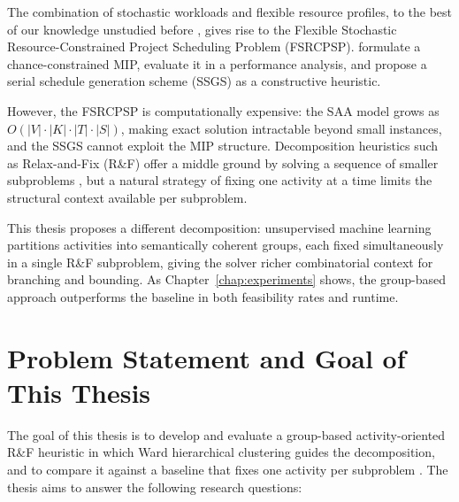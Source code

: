 The combination of stochastic workloads and flexible resource
profiles, to the best of our knowledge unstudied before
\textcite{MendlRieck2024}, gives rise to the Flexible Stochastic
Resource-Constrained Project Scheduling Problem (FSRCPSP).
\textcite{MendlRieck2024} formulate a chance-constrained MIP,
evaluate it in a performance analysis, and propose a serial
schedule generation scheme (SSGS) as a constructive heuristic.

However, the FSRCPSP is computationally expensive: the SAA model
grows as $O(|V| \cdot |K| \cdot |T| \cdot |S|)$, making exact
solution intractable beyond small instances, and the SSGS cannot
exploit the MIP structure. Decomposition heuristics such as
Relax-and-Fix (R\&F) offer a middle ground by solving a sequence
of smaller subproblems \parencite{helber2010, Tritschler2017},
but a natural strategy of fixing one activity at a time limits
the structural context available per subproblem.

This thesis proposes a different decomposition: unsupervised
machine learning partitions activities into semantically coherent
groups, each fixed simultaneously in a single R\&F subproblem,
giving the solver richer combinatorial context for branching and
bounding. As Chapter~\ref{chap:experiments} shows, the
group-based approach outperforms the baseline in both feasibility
rates and runtime.


\section{Problem Statement and Goal of This Thesis}
\label{sec:problem_statement}

The goal of this thesis is to develop and evaluate a group-based
activity-oriented R\&F heuristic in which Ward hierarchical
clustering guides the decomposition, and to compare it against a
baseline that fixes one activity per subproblem
\parencite{MendlRieck2024}. The thesis
aims to answer the following research questions:

